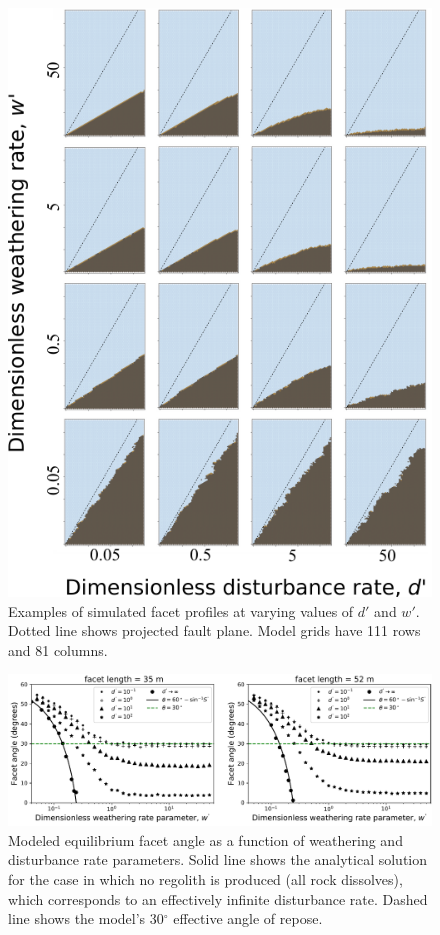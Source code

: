 \begin{figure}[ht!]
\centerline{\includegraphics[scale=1.5]{figure9.pdf}}
\caption{Examples of simulated facet profiles at varying values of $d'$ and $w'$. Dotted line shows projected fault plane. Model grids have 111 rows and 81 columns.}
\label{fig:dwprofiles}
\end{figure}

\begin{figure}[ht!]
\centerline{\includegraphics[scale=0.8]{figure10.pdf}}
\caption{Modeled equilibrium facet angle as a function of weathering and disturbance rate parameters. Solid line shows the analytical solution for the case in which no regolith is produced (all rock dissolves), which corresponds to an effectively infinite disturbance rate. Dashed line shows the model's 30$^\circ$ effective angle of repose.}
\label{fig:angw}
\end{figure}

